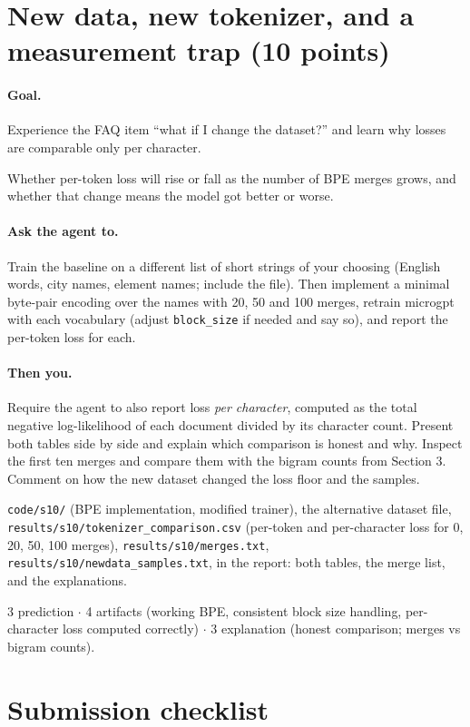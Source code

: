 \documentclass[11pt,letterpaper]{article}
\newcommand{\agent}[1]{\paragraph{Ask the agent to.} #1}
\newcommand{\you}[1]{\paragraph{Then you.} #1}
\newcommand{\goal}[1]{\paragraph{Goal.} #1}
\begin{document}
\section{New data, new tokenizer, and a measurement trap \hfill (10 points)}
\goal{Experience the FAQ item ``what if I change the dataset?'' and learn why losses are comparable only per character.}
\begin{predict}
Whether per-token loss will rise or fall as the number of BPE merges grows, and whether that change means the model got better or worse.
\end{predict}
\agent{Train the baseline on a different list of short strings of your choosing (English words, city names, element names; include the file). Then implement a minimal byte-pair encoding over the names with 20, 50 and 100 merges, retrain microgpt with each vocabulary (adjust \texttt{block\_size} if needed and say so), and report the per-token loss for each.}
\you{Require the agent to also report loss \emph{per character}, computed as the total negative log-likelihood of each document divided by its character count. Present both tables side by side and explain which comparison is honest and why. Inspect the first ten merges and compare them with the bigram counts from Section 3. Comment on how the new dataset changed the loss floor and the samples.}
\begin{deliver}
\texttt{code/s10/} (BPE implementation, modified trainer), the alternative dataset file, \texttt{results/s10/tokenizer\_comparison.csv} (per-token and per-character loss for 0, 20, 50, 100 merges), \texttt{results/s10/merges.txt}, \texttt{results/s10/newdata\_samples.txt}, in the report: both tables, the merge list, and the explanations.
\end{deliver}
\begin{rubric}3 prediction $\cdot$ 4 artifacts (working BPE, consistent block size handling, per-character loss computed correctly) $\cdot$ 3 explanation (honest comparison; merges vs bigram counts).\end{rubric}

\clearpage
\section*{Submission checklist}
\end{document}
